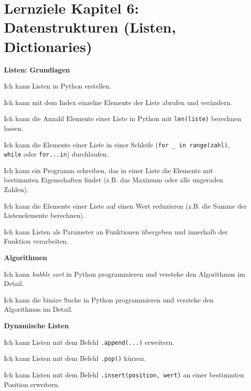 \section*{Lernziele Kapitel 6: Datenstrukturen (Listen, Dictionaries)}


\begin{todolist}
    \item \textbf{Listen: Grundlagen}
    \begin{todolist}
        \item Ich kann Listen in Python erstellen.
        \item Ich kann mit dem Index einzelne Elemente der Liste abrufen und verändern.
        \item Ich kann die Anzahl Elemente einer Liste in Python mit \lstinline|len(liste)| berechnen lassen.
        \item Ich kann die Elemente einer Liste in einer Schleife (\lstinline|for _ in range(zahl)|, \lstinline|while| oder \lstinline|for...in|) durchlaufen.
        \item Ich kann ein Programm schreiben, das in einer Liste die Elemente mit bestimmten Eigenschaften findet (z.B. das Maximum oder alle ungeraden Zahlen).
        \item Ich kann die Elemente einer Liste auf einen Wert reduzieren (z.B. die Summe der Listenelemente berechnen).
        \item Ich kann Listen als Parameter an Funktionen übergeben und innerhalb der Funktion verarbeiten.
    \end{todolist}
    \item \textbf{Algorithmen}
    \begin{todolist}
        \item Ich kann \textit{bubble sort} in Python programmieren und verstehe den Algorithmus im Detail.
        \item Ich kann die binäre Suche in Python programmieren und verstehe den Algorithmus im Detail.
    \end{todolist}
    \item \textbf{Dynamische Listen}
    \begin{todolist}
        \item Ich kann Listen mit dem Befehl \lstinline|.append(...)| erweitern.
        \item Ich kann Listen mit dem Befehl \lstinline|.pop()| kürzen.
        \item Ich kann Listen mit dem Befehl \lstinline|.insert(position, wert)| an einer bestimmten Position erweitern.

\end{todolist}
\end{todolist}
